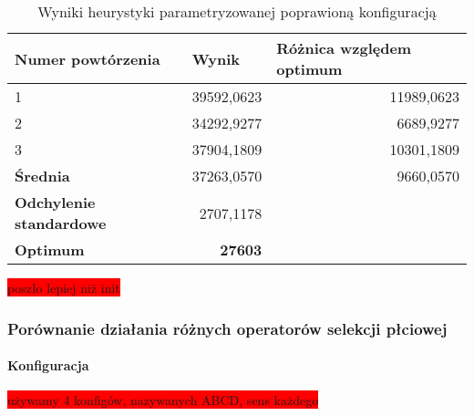 \documentclass[twoside]{iisthesis}
\newcommand{\todo}{\colorbox{red}}
\begin{document}
\begin{table}[h]
	\caption{Wyniki heurystyki parametryzowanej poprawioną konfiguracją \label{tsp_tweak_results}}
	\begin{tabular}{|l|r|r}
		\hline
		{\bf Numer powtórzenia}      & \multicolumn{1}{l|}{{\bf Wynik}} & \multicolumn{1}{l|}{{\bf Różnica względem optimum}} \\ \hline \hline
		1                            & 39592,0623                       & \multicolumn{1}{r|}{11989,0623}                     \\ \hline
		2                            & 34292,9277                       & \multicolumn{1}{r|}{6689,9277}                      \\ \hline
		3                            & 37904,1809                       & \multicolumn{1}{r|}{10301,1809}                     \\ \hline \hline
		{\bf Średnia}                & 37263,0570                       & \multicolumn{1}{r|}{9660,0570}                      \\ \hline
		{\bf Odchylenie standardowe} & 2707,1178                        &                                                     \\ \hhline{==~}
		{\bf Optimum}                & {\bf 27603}                      &                                                     \\ \cline{1-2}
	\end{tabular}
\end{table}

\todo{poszło lepiej niż init}

\subsubsection{Porównanie działania różnych operatorów selekcji płciowej}

\paragraph{Konfiguracja}
\todo{używamy 4 konfigów, nazywanych ABCD, sens każdego}
\end{document}
